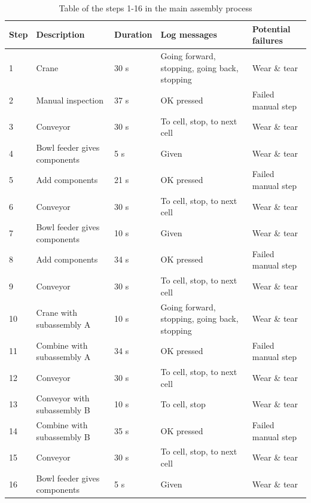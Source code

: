 \documentclass[journal]{IEEEtran}
\begin{document}
\begin{table}[!t]
\renewcommand{\arraystretch}{1.3}
\caption{Table of the steps 1-16 in the main assembly process}
\label{mainsteps1}
\centering
\begin{tabular}{|p{5mm}|p{20mm}|p{10mm}|p{15mm}|p{15mm}|}
\hline
Step & Description & Duration & Log messages & Potential failures \\
\hline
\hline
1 & Crane & 30 s & Going forward, stopping, going back, stopping & Wear \& tear \\
\hline
2 & Manual inspection & 37 s & OK pressed & Failed manual step \\
\hline
3 & Conveyor & 30 s & To cell, stop, to next cell & Wear \& tear \\
\hline
4 & Bowl feeder gives components & 5 s & Given & Wear \& tear \\
\hline
5 & Add components & 21 s & OK pressed & Failed manual step \\
\hline
6 & Conveyor & 30 s & To cell, stop, to next cell & Wear \& tear \\
\hline
7 & Bowl feeder gives components & 10 s & Given & Wear \& tear \\
\hline
8 & Add components & 34 s & OK pressed & Failed manual step \\
\hline
9 & Conveyor & 30 s & To cell, stop, to next cell & Wear \& tear \\
\hline
10 & Crane with subassembly A & 10 s & Going forward, stopping, going back, stopping & Wear \& tear \\
\hline
11 & Combine with subassembly A & 34 s & OK pressed & Failed manual step \\
\hline
12 & Conveyor & 30 s & To cell, stop, to next cell & Wear \& tear \\
\hline
13 & Conveyor with subassembly B & 10 s & To cell, stop & Wear \& tear \\
\hline
14 & Combine with subassembly B & 35 s & OK pressed & Failed manual step \\
\hline
15 & Conveyor & 30 s & To cell, stop, to next cell & Wear \& tear \\
\hline
16 & Bowl feeder gives components & 5 s & Given & Wear \& tear \\
\hline
\end{tabular}
\end{table}
\end{document}
